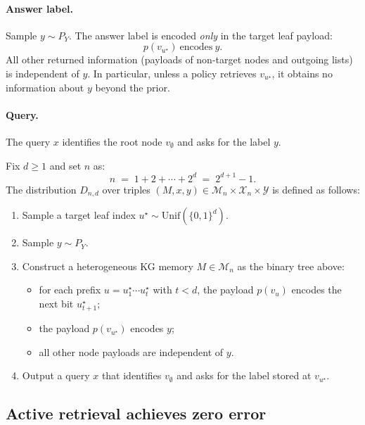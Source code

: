 \paragraph{Answer label.}
Sample \(y \sim P_Y\). The answer label is encoded \emph{only} in the target leaf payload:
\[
p(v_{u^\star})\ \text{encodes}\ y.
\]
All other returned information (payloads of non-target nodes and outgoing lists) is independent of \(y\). In particular,
unless a policy retrieves \(v_{u^\star}\), it obtains no information about \(y\) beyond the prior.

\paragraph{Query.}
The query \(x\) identifies the root node \(v_\emptyset\) and asks for the label $y$.

\begin{definition}
Fix \(d\ge 1\) and set \(n\) as:
\[
n \;=\; 1 + 2 + \cdots + 2^d \;=\; 2^{d+1}-1.
\]
The distribution \(D_{n,d}\) over triples \((M,x,y)\in \mathcal{M}_n\times \mathcal{X}_n\times \mathcal{Y}\) is defined
as follows:
\begin{enumerate}
\item Sample a target leaf index \(u^\star \sim \mathrm{Unif}(\{0,1\}^d)\).
\item Sample \(y \sim P_Y\).
\item Construct a heterogeneous KG memory \(M\in \mathcal{M}_n\) as the binary tree above:
\begin{itemize}
\item for each prefix \(u = u^\star_1\cdots u^\star_t\) with \(t<d\), the payload \(p(v_u)\) encodes the next bit
\(u^\star_{t+1}\);
\item the payload \(p(v_{u^\star})\) encodes \(y\);
\item all other node payloads are independent of
\(y\).
\end{itemize}
\item Output a query \(x\) that identifies \(v_\emptyset\) and asks for the label stored at \(v_{u^\star}\).
\end{enumerate}
\end{definition}



\subsection{Active retrieval achieves zero error}

